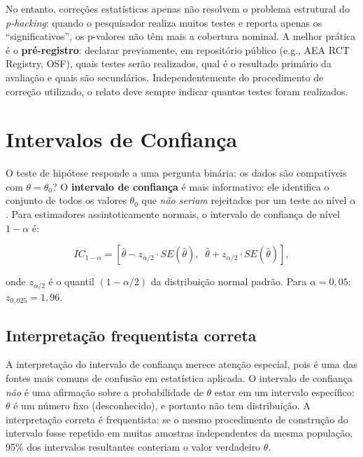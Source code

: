 No entanto, correções estatísticas apenas não resolvem o problema estrutural do \textit{p-hacking}: quando o pesquisador realiza muitos testes e reporta apenas os ``significativos'', os p-valores não têm mais a cobertura nominal. A melhor prática é o \textbf{pré-registro}: declarar previamente, em repositório público (e.g., AEA RCT Registry, OSF), quais testes serão realizados, qual é o resultado primário da avaliação e quais são secundários. Independentemente do procedimento de correção utilizado, o relato deve sempre indicar quantos testes foram realizados.


\section{Intervalos de Confiança}
\label{sec:intervalos}

O teste de hipótese responde a uma pergunta binária: os dados são compatíveis com $\theta = \theta_0$? O \textbf{intervalo de confiança} é mais informativo: ele identifica o conjunto de todos os valores $\theta_0$ que \textit{não seriam} rejeitados por um teste ao nível $\alpha$. Para estimadores assintoticamente normais, o intervalo de confiança de nível $1-\alpha$ é:

\begin{equation}
  IC_{1-\alpha} = \left[
    \hat{\theta} - z_{\alpha/2} \cdot SE(\hat{\theta}),\;\;
    \hat{\theta} + z_{\alpha/2} \cdot SE(\hat{\theta})
  \right],
  \label{eq:ic}
\end{equation}

onde $z_{\alpha/2}$ é o quantil $(1-\alpha/2)$ da distribuição normal padrão. Para $\alpha = 0{,}05$: $z_{0{,}025} = 1{,}96$.

\subsection*{Interpretação frequentista correta}

A interpretação do intervalo de confiança merece atenção especial, pois é uma das fontes mais comuns de confusão em estatística aplicada. O intervalo de confiança \textit{não} é uma afirmação sobre a probabilidade de $\theta$ estar em um intervalo específico: $\theta$ é um número fixo (desconhecido), e portanto não tem distribuição. A interpretação correta é frequentista: se o mesmo procedimento de construção do intervalo fosse repetido em muitas amostras independentes da mesma população, 95\% dos intervalos resultantes conteriam o valor verdadeiro $\theta$.

